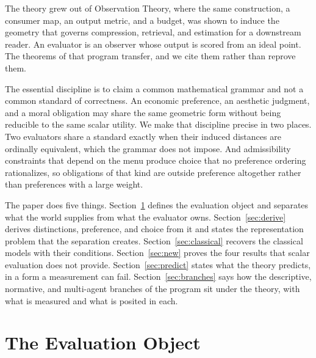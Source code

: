 \documentclass[11pt]{article}
\theoremstyle{definition}
\theoremstyle{remark}
\begin{document}
The theory grew out of Observation Theory, where the same construction, a consumer map, an output metric, and a budget, was shown to induce the geometry that governs compression, retrieval, and estimation for a downstream reader.
An evaluator is an observer whose output is scored from an ideal point.
The theorems of that program transfer, and we cite them rather than reprove them.

The essential discipline is to claim a common mathematical grammar and not a common standard of correctness.
An economic preference, an aesthetic judgment, and a moral obligation may share the same geometric form without being reducible to the same scalar utility.
We make that discipline precise in two places.
Two evaluators share a standard exactly when their induced distances are ordinally equivalent, which the grammar does not impose.
And admissibility constraints that depend on the menu produce choice that no preference ordering rationalizes, so obligations of that kind are outside preference altogether rather than preferences with a large weight.

The paper does five things.
Section~\ref{sec:object} defines the evaluation object and separates what the world supplies from what the evaluator owns.
Section~\ref{sec:derive} derives distinctions, preference, and choice from it and states the representation problem that the separation creates.
Section~\ref{sec:classical} recovers the classical models with their conditions.
Section~\ref{sec:new} proves the four results that scalar evaluation does not provide.
Section~\ref{sec:predict} states what the theory predicts, in a form a measurement can fail.
Section~\ref{sec:branches} says how the descriptive, normative, and multi-agent branches of the program sit under the theory, with what is measured and what is posited in each.

\section{The Evaluation Object}
\label{sec:object}
\end{document}
